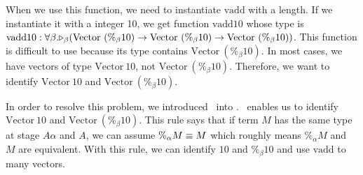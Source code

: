 \renewcommand{\Vpn}{\text{Vector}\ (\%_\beta 10)}
When we use this function, we need to instantiate $\text{vadd}$ with a length.
If we instantiate it with a integer 10, we get function $\text{vadd10}$ whose type is \\
$\text{vadd10}: \F\beta.\TW_\beta(\Vpn\to\Vpn\to\Vpn)$.
This function is difficult to use because its type contains $\Vpn$.
In most cases, we have vectors of type $\text{Vector}\ 10$, not $\Vpn$.
Therefore, we want to identify $\text{Vector}\ 10$ and $\Vpn$.

In order to resolve this problem, we introduced \QPercent\ into \LMD.
\QPercent\ enables us to identify $\text{Vector}\ 10$ and $\Vpn$.
This rule says that if term $M$ has the same type at stage $A\alpha$ and $A$,
we can assume $\%_\alpha M \equiv M$ which roughly means $\%_\alpha M$ and $M$ are equivalent.
With this rule, we can identify $10$ and $\%_\beta 10$ and use $\text{vadd}$ to many vectors.
\begin{center}
\end{center}

